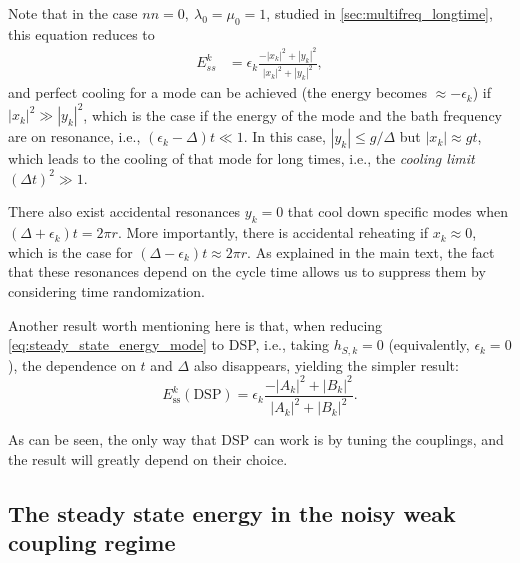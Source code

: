 Note that in the case $nn=0,\ \lambda_0=\mu_0=1$, studied in \cref{sec:multifreq_longtime}, this equation reduces to
\begin{align}
    E_{ss}^k &=\epsilon_k\frac{-|x_k|^2+|y_k|^2}{|x_k|^2+| y_k|^2},
    \label{eq:steady_state_energy_mode_nn0}
\end{align}
and perfect cooling for a mode can be achieved (the energy becomes $ \approx -\epsilon_k$) if $|x_k|^2 \gg |y_k|^2$, which is the case if the energy of the mode and the bath frequency are on resonance, i.e., $(\epsilon_k-\Delta)t\ll 1$. In this case, $|y_k|\leq g/\Delta$ but $|x_k|\approx gt$, which leads to the cooling of that mode for long times, i.e., the \textit{cooling limit} $(\Delta t)^2\gg 1$.

There also exist accidental resonances $y_k=0$ that cool down specific modes when $(\Delta+\epsilon_k)t=2\pi r$. More importantly, there is accidental reheating if $x_k\approx 0$, which is the case for $(\Delta-\epsilon_k)t \approx 2\pi r$. As explained in the main text, the fact that these resonances depend on the cycle time allows us to suppress them by considering time randomization.


Another result worth mentioning here is that, when reducing \cref{eq:steady_state_energy_mode} to DSP, i.e., taking $h_{S,k}=0$ (equivalently, $\epsilon_k=0$), the dependence on $t$ and $\Delta$ also disappears, yielding the simpler result:
\begin{equation}
    E_\text{ss}^k(\text{DSP})=\epsilon_k\frac{-|A_k|^2+|B_k|^2}{|A_k|^2+|B_k|^2}.
    \label{eq:DSP_steadystate_energy}
\end{equation}

As can be seen, the only way that DSP can work is by tuning the couplings, and the result will greatly depend on their choice.

\subsection{The steady state energy in the noisy weak coupling regime}
\label{subapp:noisy_cooling_ss}

